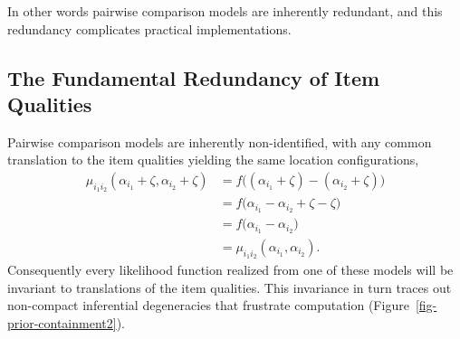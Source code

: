 \documentclass[
  letterpaper,
  DIV=11,
  numbers=noendperiod]{scrartcl}
\begin{document}
In other words pairwise comparison models are inherently redundant, and
this redundancy complicates practical implementations.

\subsection{The Fundamental Redundancy of Item
Qualities}\label{the-fundamental-redundancy-of-item-qualities}

Pairwise comparison models are inherently non-identified, with any
common translation to the item qualities yielding the same location
configurations, \begin{align*}
\mu_{i_{1} i_{2}}( \alpha_{i_{1}} + \zeta, \alpha_{i_{2}} + \zeta )
&=
f \big( (\alpha_{i_{1}} + \zeta) - (\alpha_{i_{2}} + \zeta) \big)
\\
&=
f \big( \alpha_{i_{1}} - \alpha_{i_{2}} + \zeta - \zeta \big)
\\
&=
f \big( \alpha_{i_{1}} - \alpha_{i_{2}} \big)
\\
&=
\mu_{i_{1} i_{2}}( \alpha_{i_{1}}, \alpha_{i_{2}} ).
\end{align*} Consequently every likelihood function realized from one of
these models will be invariant to translations of the item qualities.
This invariance in turn traces out non-compact inferential degeneracies
that frustrate computation (Figure~\ref{fig-prior-containment2}).
\end{document}

